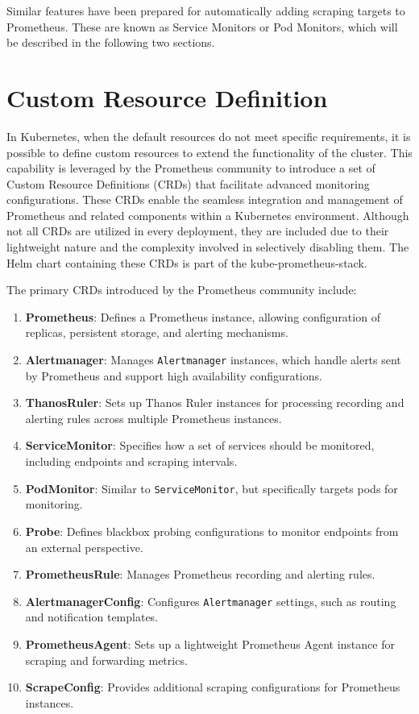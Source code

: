 Similar features have been prepared for automatically adding scraping targets to Prometheus. These are known as Service Monitors or Pod Monitors, which will be described in the following two sections.

\section{Custom Resource Definition}
In Kubernetes, when the default resources do not meet specific requirements, it is possible to define custom resources to extend the functionality of the cluster. This capability is leveraged by the Prometheus community to introduce a set of Custom Resource Definitions (CRDs) that facilitate advanced monitoring configurations. These CRDs enable the seamless integration and management of Prometheus and related components within a Kubernetes environment. Although not all CRDs are utilized in every deployment, they are included due to their lightweight nature and the complexity involved in selectively disabling them. The Helm chart containing these CRDs is part of the kube-prometheus-stack.

The primary CRDs introduced by the Prometheus community include:

\begin{enumerate}
    \item \textbf{Prometheus}: Defines a Prometheus instance, allowing configuration of replicas, persistent storage, and alerting mechanisms.
    \item \textbf{Alertmanager}: Manages \texttt{Alertmanager} instances, which handle alerts sent by Prometheus and support high availability configurations.
    \item \textbf{ThanosRuler}: Sets up Thanos Ruler instances for processing recording and alerting rules across multiple Prometheus instances.
    \item \textbf{ServiceMonitor}: Specifies how a set of services should be monitored, including endpoints and scraping intervals.
    \item \textbf{PodMonitor}: Similar to \texttt{ServiceMonitor}, but specifically targets pods for monitoring.
    \item \textbf{Probe}: Defines blackbox probing configurations to monitor endpoints from an external perspective.
    \item \textbf{PrometheusRule}: Manages Prometheus recording and alerting rules.
    \item \textbf{AlertmanagerConfig}: Configures \texttt{Alertmanager} settings, such as routing and notification templates.
    \item \textbf{PrometheusAgent}: Sets up a lightweight Prometheus Agent instance for scraping and forwarding metrics.
    \item \textbf{ScrapeConfig}: Provides additional scraping configurations for Prometheus instances.
\end{enumerate}

